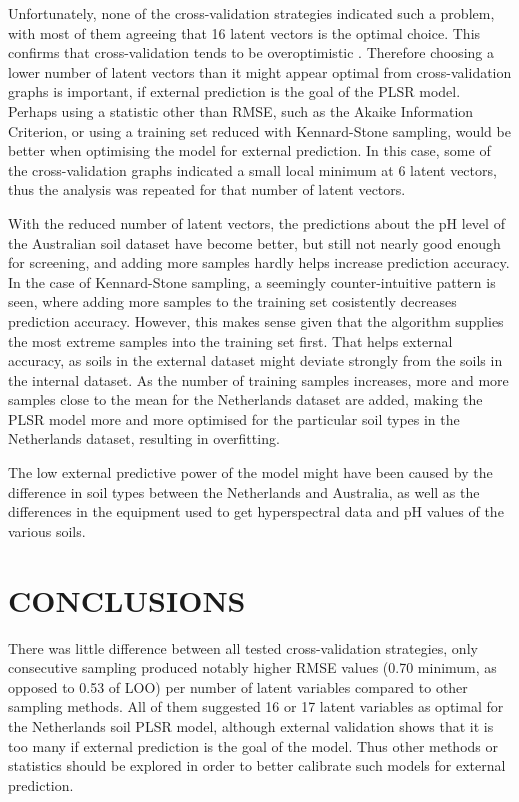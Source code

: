 \documentclass{isprs}
\begin{document}
Unfortunately, none of the cross-validation strategies indicated such a problem, with most of them agreeing that 16 latent vectors is the optimal choice. This confirms that cross-validation tends to be overoptimistic \cite{clark2003boosted}. Therefore choosing a lower number of latent vectors than it might appear optimal from cross-validation graphs is important, if external prediction is the goal of the PLSR model. Perhaps using a statistic other than RMSE, such as the Akaike Information Criterion, or using a training set reduced with Kennard-Stone sampling, would be better when optimising the model for external prediction. In this case, some of the cross-validation graphs indicated a small local minimum at 6 latent vectors, thus the analysis was repeated for that number of latent vectors.

With the reduced number of latent vectors, the predictions about the pH level of the Australian soil dataset have become better, but still not nearly good enough for screening, and adding more samples hardly helps increase prediction accuracy. In the case of Kennard-Stone sampling, a seemingly counter-intuitive pattern is seen, where adding more samples to the training set cosistently decreases prediction accuracy. However, this makes sense given that the algorithm supplies the most extreme samples into the training set first. That helps external accuracy, as soils in the external dataset might deviate strongly from the soils in the internal dataset. As the number of training samples increases, more and more samples close to the mean for the Netherlands dataset are added, making the PLSR model more and more optimised for the particular soil types in the Netherlands dataset, resulting in overfitting.

The low external predictive power of the model might have been caused by the difference in soil types between the Netherlands and Australia, as well as the differences in the equipment used to get hyperspectral data and pH values of the various soils.

\section{CONCLUSIONS}\label{sec:CONCLUSIONS}

There was little difference between all tested cross-validation strategies, only consecutive sampling produced notably higher RMSE values (0.70 minimum, as opposed to 0.53 of LOO) per number of latent variables compared to other sampling methods. All of them suggested 16 or 17 latent variables as optimal for the Netherlands soil PLSR model, although external validation shows that it is too many if external prediction is the goal of the model. Thus other methods or statistics should be explored in order to better calibrate such models for external prediction.
\end{document}
